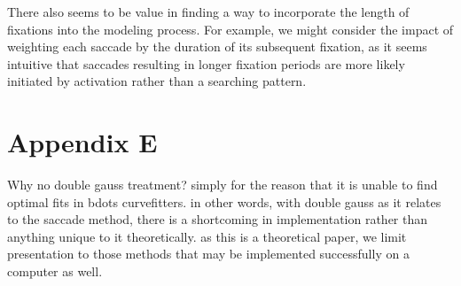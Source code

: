 \documentclass{article}
\begin{document}
There also seems to be value in finding a way to incorporate the length of fixations into the modeling process. For example, we might consider the impact of weighting each saccade by the duration of its subsequent fixation, as it seems intuitive that saccades resulting in longer fixation periods are more likely initiated by activation rather than a searching pattern.

\section*{Appendix E}

Why no double gauss treatment? simply for the reason that it is unable to find optimal fits in bdots curvefitters. in other words, with double gauss as it relates to the saccade method, there is a shortcoming in implementation rather than anything unique to it theoretically. as this is a theoretical paper, we limit presentation to those methods that may be implemented successfully on a computer as well.
\end{document}

